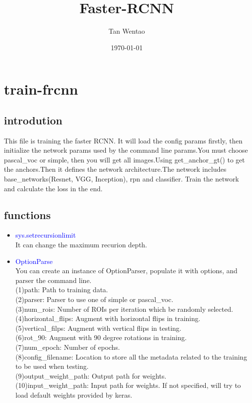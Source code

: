 \documentclass[UTF8,a4paper,11pt]{ctexart}
\title{Faster-RCNN}
\author{Tan Wentao}
\date{\today}
\begin{document}
\maketitle
\section{train-frcnn}
    \subsection{introdution}
        This file is training the faster RCNN. It will load the config params firstly, then initialize the network params used by the command line params.You must choose pascal\_voc or simple, then you will get all images.Using get\_anchor\_gt() to get the anchors.Then it defines the network architecture.The network includes base\_networks(Resnet, VGG, Inception), rpn and classifier. Train the network and calculate the loss in the end.
    \subsection{functions}
        \begin{itemize}
            \item {\textcolor{blue}{sys.setrecursionlimit}} \\
                It can change the maximum recurion depth.
            \item {\textcolor{blue}{OptionParse}} \\
                You can create an instance of OptionParser, populate it with options, and parser the command line. \\
                (1)path: Path to training data. \\
                (2)parser: Parser to use one of simple or pascal\_voc. \\
                (3)num\_rois: Number of ROIs per iteration which be randomly selected. \\
                (4)horizontal\_flips: Augment with horizontal flips in training. \\
                (5)vertical\_filps: Augment with vertical flips in testing. \\
                (6)rot\_90: Augment with 90 degree rotations in training.\\
                (7)num\_epoch: Number of epochs. \\
                (8)config\_filename: Location to store all the metadata related to the training to be used when testing.\\
                (9)output\_weight\_path: Output path for weights. \\ 
                (10)input\_weight\_path: Input path for weights. If not specified, will try to load default weights provided by keras. \\
            \end{itemize}
\end{document}
